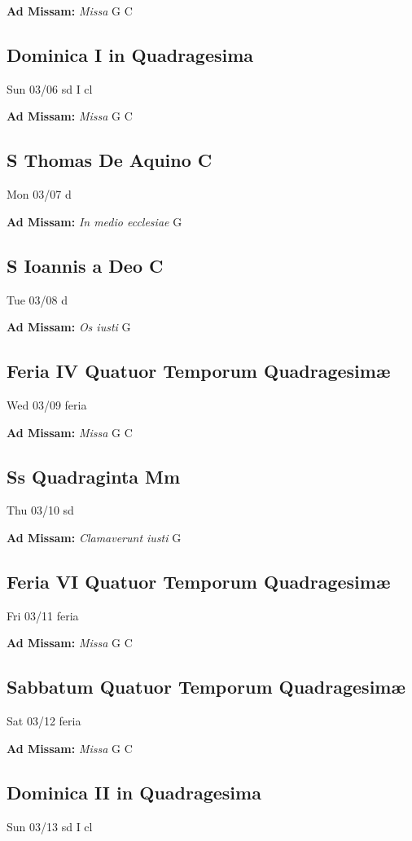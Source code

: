 \documentclass[letterpaper, 10pt, twocolumn]{article}
\begin{document}
\textbf{Ad Missam:} \textit{Missa} G C 

\subsection*{Dominica I in Quadragesima}Sun 03/06 sd I cl

\textbf{Ad Missam:} \textit{Missa} G C 

\subsection*{S Thomas De Aquino C}Mon 03/07 d

\textbf{Ad Missam:} \textit{In medio ecclesiae} G 

\subsection*{S Ioannis a Deo C}Tue 03/08 d

\textbf{Ad Missam:} \textit{Os iusti} G 

\subsection*{Feria IV Quatuor Temporum Quadragesimæ}Wed 03/09 feria

\textbf{Ad Missam:} \textit{Missa} G C 

\subsection*{Ss Quadraginta Mm}Thu 03/10 sd

\textbf{Ad Missam:} \textit{Clamaverunt iusti} G 

\subsection*{Feria VI Quatuor Temporum Quadragesimæ}Fri 03/11 feria

\textbf{Ad Missam:} \textit{Missa} G C 

\subsection*{Sabbatum Quatuor Temporum Quadragesimæ}Sat 03/12 feria

\textbf{Ad Missam:} \textit{Missa} G C 

\subsection*{Dominica II in Quadragesima}Sun 03/13 sd I cl
\end{document}
